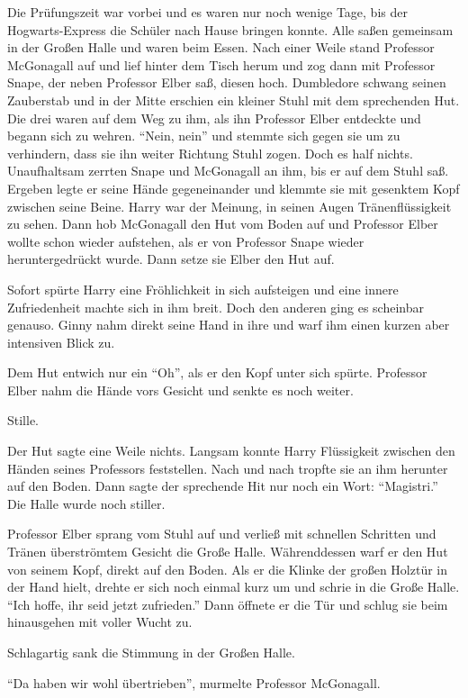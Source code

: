 Die Prüfungszeit war vorbei und es waren nur noch wenige Tage, bis der Hogwarts-Express die Schüler nach Hause bringen konnte. Alle saßen gemeinsam in der Großen Halle und waren beim Essen. Nach einer Weile stand Professor McGonagall auf und lief hinter dem Tisch herum und zog dann mit Professor Snape, der neben Professor Elber saß, diesen hoch. Dumbledore schwang seinen Zauberstab und in der Mitte erschien ein kleiner Stuhl mit dem sprechenden Hut. Die drei waren auf dem Weg zu ihm, als ihn Professor Elber entdeckte und begann sich zu wehren. \enquote{Nein, nein} und stemmte sich gegen sie um zu verhindern, dass sie ihn weiter Richtung Stuhl zogen. Doch es half nichts. Unaufhaltsam zerrten Snape und McGonagall an ihm, bis er auf dem Stuhl saß. Ergeben legte er seine Hände gegeneinander und klemmte sie mit gesenktem Kopf zwischen seine Beine. Harry war der Meinung, in seinen Augen Tränenflüssigkeit zu sehen. Dann hob McGonagall den Hut vom Boden auf und Professor Elber wollte schon wieder aufstehen, als er von Professor Snape wieder heruntergedrückt wurde. Dann setze sie Elber den Hut auf.

Sofort spürte Harry eine Fröhlichkeit in sich aufsteigen und eine innere Zufriedenheit machte sich in ihm breit. Doch den anderen ging es scheinbar genauso. Ginny nahm direkt seine Hand in ihre und warf ihm einen kurzen aber intensiven Blick zu.

Dem Hut entwich nur ein \enquote{Oh}, als er den Kopf unter sich spürte. Professor Elber nahm die Hände vors Gesicht und senkte es noch weiter.

Stille.

Der Hut sagte eine Weile nichts. Langsam konnte Harry Flüssigkeit zwischen den Händen seines Professors feststellen. Nach und nach tropfte sie an ihm herunter auf den Boden. Dann sagte der sprechende Hit nur noch ein Wort: \enquote{Magistri.} Die Halle wurde noch stiller.

Professor Elber sprang vom Stuhl auf und verließ mit schnellen Schritten und Tränen überströmtem Gesicht die Große Halle. Währenddessen warf er den Hut von seinem Kopf, direkt auf den Boden. Als er die Klinke der großen Holztür in der Hand hielt, drehte er sich noch einmal kurz um und schrie in die Große Halle. \enquote{Ich hoffe, ihr seid jetzt zufrieden.} Dann öffnete er die Tür und schlug sie beim hinausgehen mit voller Wucht zu.

Schlagartig sank die Stimmung in der Großen Halle.

\enquote{Da haben wir wohl übertrieben}, murmelte Professor McGonagall.

